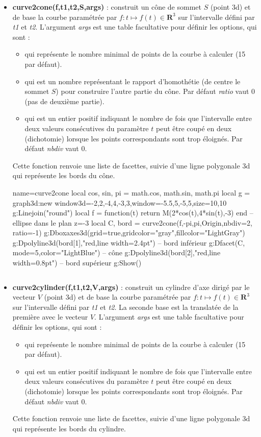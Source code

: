 \documentclass[%
10pt,%
a4paper,%
french,%
]%
{article}%
\newenvironment*{demo}[2][]{%
\gdef\legende{#2}%
\gdef\lab{#1}%
\bgroup
\VerbatimOut{\jobname.tmp}%
}%
{%
\endVerbatimOut%
\egroup%
\inputminted[ignorelexererrors=true,breaklines,bgcolor=Beige,linenos,numbersep=6pt,frame=single,fontsize=\footnotesize]{Lua}{\jobname.tmp}%
\begin{minipage}{0.9\textwidth}
\begin{center}
\captionof{figure}{\legende}\label{\lab}%
%
\end{center}
\end{minipage}
}
\begin{document}
\begin{itemize}
    \item \textbf{curve2cone(f,t1,t2,S,args)} : construit un cône de sommet $S$ (point 3d) et de base la courbe paramétrée par $f\colon t\mapsto f(t)\in\mathbf R^3$ sur l'intervalle défini par \emph{t1} et \emph{t2}. L'argument \emph{args} est une table facultative pour définir les options, qui sont :
    \begin{itemize}
        \item {} qui représente le nombre minimal de points de la courbe à calculer (15 par défaut).
        \item {} qui est un nombre représentant le rapport d'homothétie (de centre le sommet $S$) pour construire l'autre partie du cône. Par défaut \emph{ratio} vaut 0 (pas de deuxième partie).
        \item {} qui est un entier positif indiquant le nombre de fois que l'intervalle entre deux valeurs consécutives du paramètre $t$ peut être coupé en deux (dichotomie) lorsque les points correspondants sont trop éloignés. Par défaut \emph{nbdiv} vaut 0.
    \end{itemize}
 Cette fonction renvoie une liste de facettes, suivie d'une ligne polygonale 3d qui représente les bords du cône.
 
\begin{demo}{Exemple de cône elliptique}
\begin{luadraw}{name=curve2cone}
local cos, sin, pi = math.cos, math.sin, math.pi
local g = graph3d:new{ window3d={-2,2,-4,4,-3,3},window={-5.5,5,-5,5},size={10,10}}
g:Linejoin("round")
local f = function(t) return M(2*cos(t),4*sin(t),-3) end -- ellipse dans le plan z=-3
local C, bord = curve2cone(f,-pi,pi,Origin,{nbdiv=2, ratio=-1})
g:Dboxaxes3d({grid=true,gridcolor="gray",fillcolor="LightGray"})
g:Dpolyline3d(bord[1],"red,line width=2.4pt") -- bord inférieur
g:Dfacet(C, {mode=5,color="LightBlue"})  -- cône
g:Dpolyline3d(bord[2],"red,line width=0.8pt") -- bord supérieur
g:Show()
\end{luadraw}
\end{demo}

    \item \textbf{curve2cylinder(f,t1,t2,V,args)} : construit un cylindre d'axe dirigé par le vecteur $V$ (point 3d) et de base la courbe paramétrée par $f\colon t\mapsto f(t)\in\mathbf R^3$ sur l'intervalle défini par \emph{t1} et \emph{t2}. La seconde base est la translatée de la première avec le vecteur $V$. L'argument \emph{args} est une table facultative pour définir les options, qui sont :
    \begin{itemize}
        \item {} qui représente le nombre minimal de points de la courbe à calculer (15 par défaut).
        \item {} qui est un entier positif indiquant le nombre de fois que l'intervalle entre deux valeurs consécutives du paramètre $t$ peut être coupé en deux (dichotomie) lorsque les points correspondants sont trop éloignés. Par défaut \emph{nbdiv} vaut 0.
    \end{itemize}
 Cette fonction renvoie une liste de facettes, suivie d'une ligne polygonale 3d qui représente les bords du cylindre.
 

\end{itemize}
\end{document}
